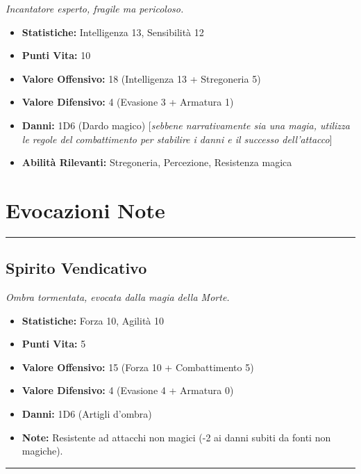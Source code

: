 \documentclass[../manuale_main.tex]{subfiles}
\begin{document}
\textit{Incantatore esperto, fragile ma pericoloso.}
\begin{itemize}
\item \textbf{Statistiche:} Intelligenza 13, Sensibilità 12
\item \textbf{Punti Vita:} 10
\item \textbf{Valore Offensivo:} 18 (Intelligenza 13 + Stregoneria 5)
\item \textbf{Valore Difensivo:} 4 (Evasione 3 + Armatura 1)
\item \textbf{Danni:} 1D6 (Dardo magico) [\textit{sebbene narrativamente sia una magia, utilizza le regole del combattimento per stabilire i danni e il successo dell'attacco}]
\item \textbf{Abilità Rilevanti:} Stregoneria, Percezione, Resistenza magica
\end{itemize}

\clearpage
\section*{Evocazioni Note}

\vspace{0.2cm}
\noindent
\begin{center}
\rule{\textwidth}{0.4pt} 
\end{center}
\vspace{0.2cm}

\subsection*{Spirito Vendicativo}

\textit{Ombra tormentata, evocata dalla magia della Morte.}
\begin{itemize}
\item \textbf{Statistiche:} Forza 10, Agilità 10
\item \textbf{Punti Vita:} 5
\item \textbf{Valore Offensivo:} 15 (Forza 10 + Combattimento 5)
\item \textbf{Valore Difensivo:} 4 (Evasione 4 + Armatura 0)
\item \textbf{Danni:} 1D6 (Artigli d'ombra)
\item \textbf{Note:} Resistente ad attacchi non magici (-2 ai danni subiti da fonti non magiche).
\end{itemize}
\vspace{0.2cm}
\noindent
\begin{center}
\rule{\textwidth}{0.4pt} 
\end{center}
\end{document}
